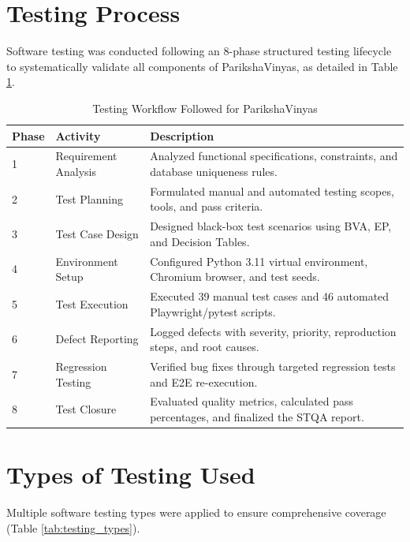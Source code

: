 \documentclass{InternshipReport}
\begin{document}
\section{Testing Process}
Software testing was conducted following an 8-phase structured testing lifecycle to systematically validate all components of ParikshaVinyas, as detailed in Table \ref{tab:testing_workflow}.

\begin{table}[H]
\centering
\small
\caption{Testing Workflow Followed for ParikshaVinyas}
\label{tab:testing_workflow}
\begin{tabular}{p{} p{} p{}}
\toprule
\textbf{Phase} & \textbf{Activity} & \textbf{Description} \\
\midrule
1 & Requirement Analysis & Analyzed functional specifications, constraints, and database uniqueness rules. \\
2 & Test Planning & Formulated manual and automated testing scopes, tools, and pass criteria. \\
3 & Test Case Design & Designed black-box test scenarios using BVA, EP, and Decision Tables. \\
4 & Environment Setup & Configured Python 3.11 virtual environment, Chromium browser, and test seeds. \\
5 & Test Execution & Executed 39 manual test cases and 46 automated Playwright/pytest scripts. \\
6 & Defect Reporting & Logged defects with severity, priority, reproduction steps, and root causes. \\
7 & Regression Testing & Verified bug fixes through targeted regression tests and E2E re-execution. \\
8 & Test Closure & Evaluated quality metrics, calculated pass percentages, and finalized the STQA report. \\
\bottomrule
\end{tabular}
\end{table}

\section{Types of Testing Used}
Multiple software testing types were applied to ensure comprehensive coverage (Table \ref{tab:testing_types}).
\end{document}

